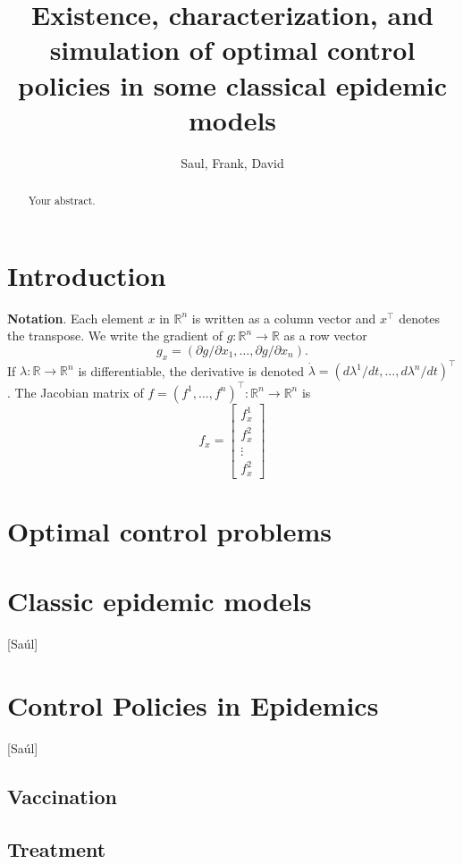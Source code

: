 \documentclass[a4paper]{amsart}
\title[%
	Existence, characterization and simulation of OCP for some epidemic 
	Models%
	]{
	Existence, characterization, and simulation
	of optimal control policies in some classical epidemic models
}
\author{Saul, Frank, David}
\newcommand{\R}{\mathbb{R}}
\begin{document}
	\maketitle
\maketitle

\begin{abstract}
	Your abstract.
\end{abstract}

\section{Introduction}

{\bf Notation}. Each element $x$ in $\R^n$ is written as a column vector and $x^\top$ denotes the transpose. We write the gradient of $g:\R^n\to\R$ as a row vector 
    \[ g_x =(\partial g/\partial x_1,\ldots, \partial g/\partial x_n). \]
If $\lambda:\R\to\R^n$ is differentiable, the derivative is denoted $\dot{\lambda}=(d\lambda^1/dt,\ldots,d\lambda^n/dt)^\top$. The Jacobian matrix of $f=(f^1,\ldots,f^n)^\top:\R^n\to\R^n$ is   
\[f_x=\begin{bmatrix}
f^1_x\\
f^2_x\\
\vdots \\
f^2_x
\end{bmatrix}\]

	\section{Optimal control problems}
		
	\section{Classic epidemic models}
	[Saúl]
	\section{Control Policies in Epidemics}
	[Saúl]
    	
      \subsection{Vaccination}
      		
	    	
	    \subsection{Treatment}
	    	
	    	
\end{document}
